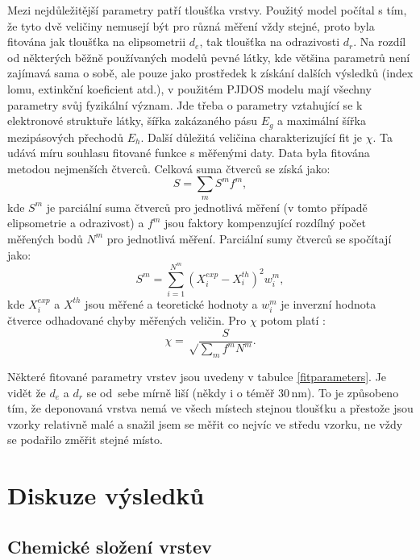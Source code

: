 \documentclass[12pt,oneside,final]{fithesis2}
\begin{document}
Mezi nejdůležitější parametry patří tloušťka vrstvy. Použitý model počítal s tím, že tyto dvě veličiny nemusejí být pro různá měření vždy stejné, proto byla fitována jak tloušťka na elipsometrii $d_e$, tak tloušťka na odrazivosti $d_r$. Na rozdíl od některých běžně používaných modelů pevné látky, kde většina parametrů není zajímavá sama o sobě, ale pouze jako prostředek k získání dalších výsledků (index lomu, extinkční koeficient atd.), v použitém PJDOS modelu mají všechny parametry svůj fyzikální význam. Jde třeba o parametry vztahující se k elektronové struktuře látky, šířka zakázaného pásu $E_g$ a maximální šířka mezipásových přechodů $E_h$. Další důležitá veličina charakterizující fit je $\chi$. Ta udává míru souhlasu fitované funkce s měřenými daty. Data byla fitována metodou nejmenších čtverců. Celková suma čtverců se získá jako:
%
\begin{equation} S = \sum_m S^m f^m \mathrm{,}\end{equation}
%
kde $S^m$ je parciální suma čtverců pro jednotlivá měření (v tomto případě elipsometrie a odrazivost) a $f^m$ jsou faktory kompenzující rozdílný počet měřených bodů $N^m$ pro jednotlivá měření. Parciální sumy čtverců se spočítají jako:
%
\begin{equation} S^m = \sum_{i=1}^{N^m} (X_i^{exp} - X_i^{th})^2 w_i^m \mathrm{,} \end{equation}
%
kde $X_i^{exp}$ a $X^{th}$ jsou měřené a teoretické hodnoty a $w_i^m$ je inverzní hodnota čtverce odhadované chyby měřených veličin. Pro $\chi$ potom platí \cite{Franta2011}:
%
\begin{equation} \chi = \sqrt \frac{S}{\sum_m f^m N^m} \mathrm{.}\end{equation}  
 
Některé fitované parametry vrstev jsou uvedeny v tabulce \ref{fitparameters}. Je vidět že $d_e$ a $d_r$ se od~sebe mírně liší (někdy i o téměř 30\,nm). To je způsobeno tím, že deponovaná vrstva nemá ve všech místech stejnou tloušťku a přestože jsou vzorky relativně malé a snažil jsem se měřit co nejvíc ve středu vzorku, ne vždy se podařilo změřit stejné místo.





\chapter{Diskuze výsledků}


\section{Chemické složení vrstev}
\end{document}
